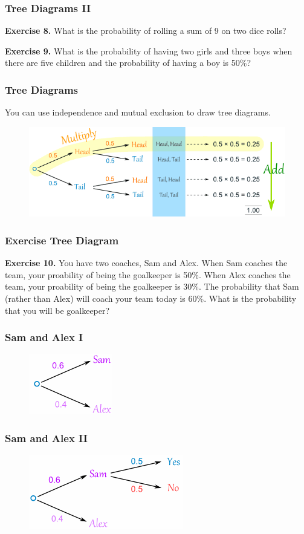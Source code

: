 \documentclass[xcolor=dvipsnames]{beamer}
\begin{document}
\begin{frame}
  \frametitle{Tree Diagrams II}
\textbf{Exercise 8.} What is the probability of rolling a sum of 9 on
two dice rolls?

\textbf{Exercise 9.} What is the probability of having two girls and
three boys when there are five children and the probability of having
a boy is 50\%?
\end{frame}

\begin{frame}
  \frametitle{Tree Diagrams}
You can use independence and mutual exclusion to draw tree diagrams.
\begin{figure}[h]
\includegraphics[scale=.5]{./tree.png}
\end{figure}
\end{frame}

\begin{frame}
  \frametitle{Exercise Tree Diagram}
\textbf{Exercise 10.} You have two coaches, Sam and Alex. When Sam
coaches the team, your proability of being the goalkeeper is 50\%. When Alex
coaches the team, your proability of being the goalkeeper is 30\%. The
probability that Sam (rather than Alex) will coach your team today is
60\%. What is the probability that you will be goalkeeper?
\end{frame}

\newcommand{\sam}{.65}

\begin{frame}
  \frametitle{Sam and Alex I}
\begin{figure}[h]
\includegraphics[scale=\sam]{./sam1.png}
\end{figure}
\end{frame}

\begin{frame}
  \frametitle{Sam and Alex II}
\begin{figure}[h]
\includegraphics[scale=\sam]{./sam2.png}
\end{figure}
\end{frame}
\end{document}
